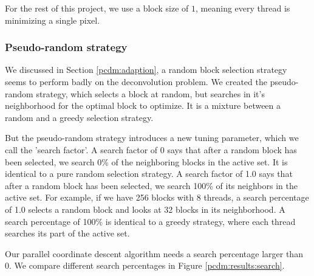 For the rest of this project, we use a block size of $1$, meaning every thread is minimizing a single pixel.


\subsubsection{Pseudo-random strategy}
We discussed in Section \ref{pcdm:adaption}, a random block selection strategy seems to perform badly on the deconvolution problem. We created the pseudo-random strategy, which selects a block at random, but searches in it's neighborhood for the optimal block to optimize. It is a mixture between a random and a greedy selection strategy.

But the pseudo-random strategy introduces a new tuning parameter, which we call the 'search factor'. A search factor of 0 says that after a random block has been selected, we search 0\% of the neighboring blocks in the active set. It is identical to a pure random selection strategy. A search factor of 1.0 says that after a random block has been selected, we search 100\% of its neighbors in the active set. For example, if we have 256 blocks with 8 threads, a search percentage of 1.0 selects a random block and looks at 32 blocks in its neighborhood. A search percentage of 100\% is identical to a greedy strategy, where each thread searches its part of the active set.

Our parallel coordinate descent algorithm needs a search percentage larger than 0. We compare different search percentages in Figure \ref{pcdm:results:search}.

